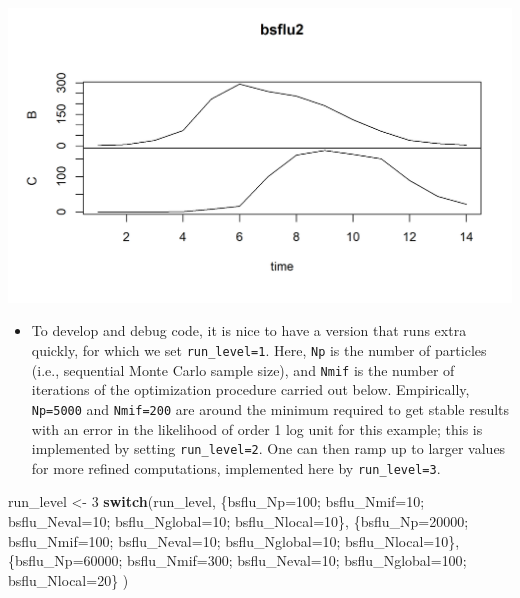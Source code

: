 \documentclass[]{article}
\newenvironment{Shaded}{\begin{snugshade}}{\end{snugshade}}
\newcommand{\DecValTok}[1]{\textcolor[rgb]{0.00,0.00,0.81}{#1}}
\newcommand{\StringTok}[1]{\textcolor[rgb]{0.31,0.60,0.02}{#1}}
\newcommand{\ControlFlowTok}[1]{\textcolor[rgb]{0.13,0.29,0.53}{\textbf{#1}}}
\newcommand{\NormalTok}[1]{#1}
\providecommand{\tightlist}{%
  \setlength{\itemsep}{0pt}\setlength{\parskip}{0pt}}
\begin{document}

\begin{center}\includegraphics{figure/notes12-pomp_bsflu-1} \end{center}

\begin{itemize}
\tightlist
\item
  To develop and debug code, it is nice to have a version that runs
  extra quickly, for which we set \texttt{run\_level=1}. Here,
  \texttt{Np} is the number of particles (i.e., sequential Monte Carlo
  sample size), and \texttt{Nmif} is the number of iterations of the
  optimization procedure carried out below. Empirically,
  \texttt{Np=5000} and \texttt{Nmif=200} are around the minimum required
  to get stable results with an error in the likelihood of order 1 log
  unit for this example; this is implemented by setting
  \texttt{run\_level=2}. One can then ramp up to larger values for more
  refined computations, implemented here by \texttt{run\_level=3}.
\end{itemize}

\begin{Shaded}
\begin{Highlighting}[]
\NormalTok{run_level <-}\StringTok{ }\DecValTok{3}
\ControlFlowTok{switch}\NormalTok{(run_level,}
\NormalTok{       \{bsflu_Np=}\DecValTok{100}\NormalTok{; bsflu_Nmif=}\DecValTok{10}\NormalTok{; bsflu_Neval=}\DecValTok{10}\NormalTok{; bsflu_Nglobal=}\DecValTok{10}\NormalTok{; bsflu_Nlocal=}\DecValTok{10}\NormalTok{\}, }
\NormalTok{       \{bsflu_Np=}\DecValTok{20000}\NormalTok{; bsflu_Nmif=}\DecValTok{100}\NormalTok{; bsflu_Neval=}\DecValTok{10}\NormalTok{; bsflu_Nglobal=}\DecValTok{10}\NormalTok{; bsflu_Nlocal=}\DecValTok{10}\NormalTok{\}, }
\NormalTok{       \{bsflu_Np=}\DecValTok{60000}\NormalTok{; bsflu_Nmif=}\DecValTok{300}\NormalTok{; bsflu_Neval=}\DecValTok{10}\NormalTok{; bsflu_Nglobal=}\DecValTok{100}\NormalTok{; bsflu_Nlocal=}\DecValTok{20}\NormalTok{\}}
\NormalTok{)}
\end{Highlighting}
\end{Shaded}
\end{document}
